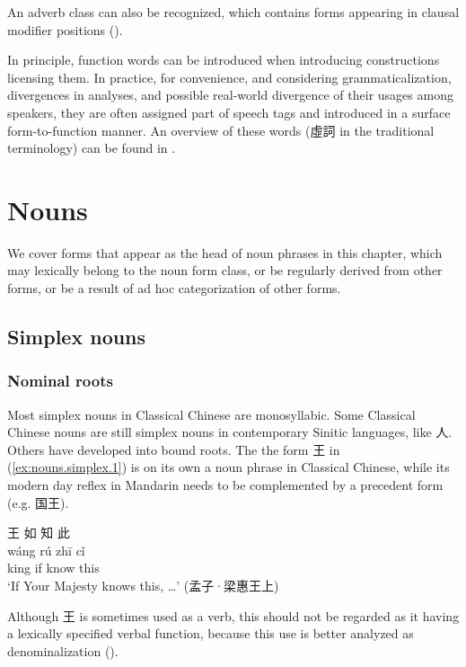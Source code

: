 \documentclass[UTF8, a4paper, oneside, scheme=plain, 12pt]{ctexrep}
\newcommand*{\citechap}[1]{Ch.~{#1}}
\newcommand{\translate}[1]{`#1'}
\begin{document}
An adverb class can also be recognized,
which contains forms appearing in clausal modifier positions ().

In principle, function words can be introduced when introducing constructions licensing them.
In practice, for convenience, and considering grammaticalization, divergences in analyses,
and possible real-world divergence of their usages among speakers,
they are often assigned part of speech tags and introduced in a surface form-to-function manner.
An overview of these words (虛詞 in the traditional terminology) can be found in \citet[\citechap{4}]{li2004grammar}.



\chapter{Nouns}

We cover forms that appear as the head of noun phrases in this chapter,
which may lexically belong to the noun form class, or be regularly derived from other forms,
or be a result of ad hoc categorization of other forms.

\section{Simplex nouns}

\subsection{Nominal roots}\label{sec:nouns.simplex.noun-root}

Most simplex nouns in Classical Chinese are monosyllabic.
Some Classical Chinese nouns are still simplex nouns in contemporary Sinitic languages, like 人.
Others have developed into bound roots.
The the form 王 in (\ref{ex:nouns.simplex.1}) is on its own a noun phrase in Classical Chinese,
while its modern day reflex in Mandarin needs to be complemented by a precedent form (e.g. 国王).

\begin{exe}
    \ex\label{ex:nouns.simplex.1}
    \glll 王 如 知 此 \\
    wáng rú zhī cǐ \\
    king if know this \\
    \glt\translate{If Your Majesty knows this, \dots} \hfill (孟子·梁惠王上)
\end{exe}

Although 王 is sometimes used as a verb,
this should not be regarded as it having a lexically specified verbal function,
because this use is better analyzed as denominalization ().
\end{document}
